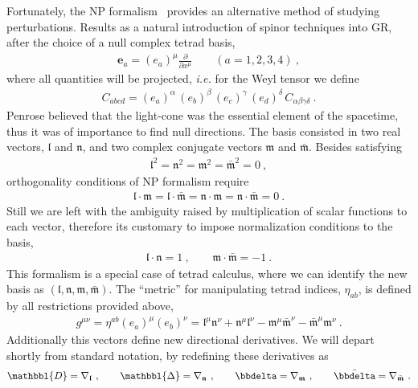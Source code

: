 Fortunately, the NP formalism~\cite{Newman1962} provides an alternative method of studying perturbations.
Results as a natural introduction of spinor techniques into GR, after the choice of a null complex tetrad basis,
\begin{align}
    \bm{e}_a = (e_a)^\mu \frac{\partial}{\partial x^\mu} \qquad (a = 1, 2, 3, 4) ~,
\end{align}
where all quantities will be projected, \emph{i.e.} for the Weyl tensor we define
\begin{align}
    C_{abcd} =  (e_a)^\alpha \,(e_b)^\beta \,(e_c)^\gamma \,(e_d)^\delta \,C_{\alpha\beta\gamma\delta} ~.
\end{align}
Penrose believed that the light-cone was the essential element of the spacetime, thus it was of importance to find null directions. The basis consisted in two real vectors, $\bm{\mathfrak{l}}$ and $\bm{\mathfrak{n}}$, and two complex conjugate vectors $\bm{\mathfrak{m}}$ and $\bar{\bm{\mathfrak{m}}}$. Besides satisfying
\begin{align}
    \bm{\mathfrak{l}}^2 = \bm{\mathfrak{n}}^2 = \bm{\mathfrak{m}}^2 = \bar{\bm{\mathfrak{m}}}^2 = 0 ~,
\end{align}
orthogonality conditions of NP formalism require
\begin{align}
   \bm{\mathfrak{l}} \cdot \bm{\mathfrak{m}} = \bm{\mathfrak{l}} \cdot \bar{\bm{\mathfrak{m}}} = \bm{\mathfrak{n}} \cdot \bm{\mathfrak{m}} = \bm{\mathfrak{n}} \cdot \bar{\bm{\mathfrak{m}}} = 0 ~.
\end{align}
Still we are left with the ambiguity raised by multiplication of scalar functions to each vector, therefore its customary to impose normalization conditions to the basis,
\begin{align}
    \bm{\mathfrak{l}} \cdot \bm{\mathfrak{n}} = 1 ~, \qquad \bm{\mathfrak{m}} \cdot \bar{\bm{\mathfrak{m}}} = -1 ~.
\end{align}
This formalism is a special case of tetrad calculus, where we can identify the new basis as $(\bm{\mathfrak{l}},\bm{\mathfrak{n}},\bm{\mathfrak{m}},\bar{\bm{\mathfrak{m}}})$. The ``metric'' for manipulating tetrad indices, $\eta_{ab}$, is defined by all restrictions provided above,
\begin{align}
    g^{\mu\nu} = \eta^{ab} (e_a)^\mu (e_b)^\nu = \mathfrak{l}^{\mu} \mathfrak{n}^{\nu} + \mathfrak{n}^{\mu} \mathfrak{l}^{\nu} - \mathfrak{m}^{\mu} \bar{\mathfrak{m}}^{\nu} - \bar{\mathfrak{m}}^{\mu} \mathfrak{m}^{\nu} ~.
\end{align}
Additionally this vectors define new directional derivatives.
We will depart shortly from standard notation, by redefining these derivatives as
\begin{align}
    \mathbbl{D}=\nabla_{\bm{\mathfrak{l}}} ~,\qquad \mathbbl{\Delta}=\nabla_{\bm{\mathfrak{n}}} ~,\qquad \bbdelta=\nabla_{\bm{\mathfrak{m}}} ~,\qquad \bar{\bbdelta}=\nabla_{\bar{\bm{\mathfrak{m}}}} ~.
    \label{eq3:tetradCovDer}
\end{align}

